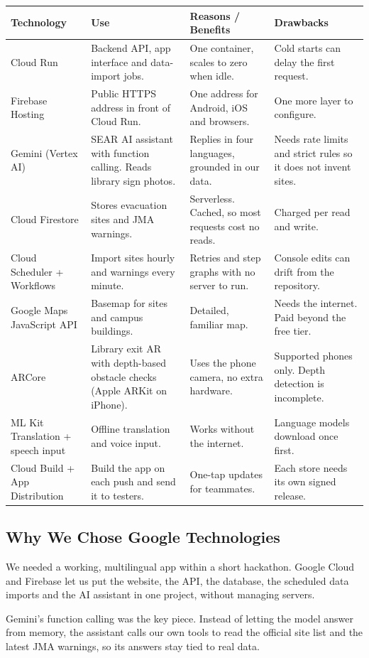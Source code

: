 \documentclass[11pt,a4paper]{article}
\newenvironment{answerbox}
  {\par\vspace{4pt}\setlength{\fboxsep}{10pt}\setlength{\fboxrule}{0.4pt}%
   \begin{lrbox}{\answerboxcontent}%
   \begin{minipage}{\dimexpr\textwidth-2\fboxsep-2\fboxrule\relax}}
  {\end{minipage}\end{lrbox}%
   \noindent\fbox{\usebox{\answerboxcontent}}\par\vspace{4pt}}
\begin{document}
\noindent
\begin{tabularx}{\textwidth}{@{}L{2.9cm}YYY@{}}
\toprule
\textbf{Technology} & \textbf{Use} & \textbf{Reasons / Benefits} & \textbf{Drawbacks} \\
\midrule
Cloud Run & Backend API, app interface and data-import jobs. & One container, scales to zero when idle. & Cold starts can delay the first request. \\
Firebase Hosting & Public HTTPS address in front of Cloud Run. & One address for Android, iOS and browsers. & One more layer to configure. \\
Gemini (Vertex AI) & SEAR AI assistant with function calling. Reads library sign photos. & Replies in four languages, grounded in our data. & Needs rate limits and strict rules so it does not invent sites. \\
Cloud Firestore & Stores evacuation sites and JMA warnings. & Serverless. Cached, so most requests cost no reads. & Charged per read and write. \\
Cloud Scheduler + Workflows & Import sites hourly and warnings every minute. & Retries and step graphs with no server to run. & Console edits can drift from the repository. \\
Google Maps JavaScript API & Basemap for sites and campus buildings. & Detailed, familiar map. & Needs the internet. Paid beyond the free tier. \\
ARCore & Library exit AR with depth-based obstacle checks (Apple ARKit on iPhone). & Uses the phone camera, no extra hardware. & Supported phones only. Depth detection is incomplete. \\
ML Kit Translation + speech input & Offline translation and voice input. & Works without the internet. & Language models download once first. \\
Cloud Build + App Distribution & Build the app on each push and send it to testers. & One-tap updates for teammates. & Each store needs its own signed release. \\
\bottomrule
\end{tabularx}

\vspace{14pt}
\subsection{Why We Chose Google Technologies}

\begin{answerbox}
We needed a working, multilingual app within a short hackathon. Google Cloud and Firebase
let us put the website, the API, the database, the scheduled data imports and the AI
assistant in one project, without managing servers.

Gemini's function calling was the key piece. Instead of letting the model answer from
memory, the assistant calls our own tools to read the official site list and the latest
JMA warnings, so its answers stay tied to real data.
\end{answerbox}
\end{document}

